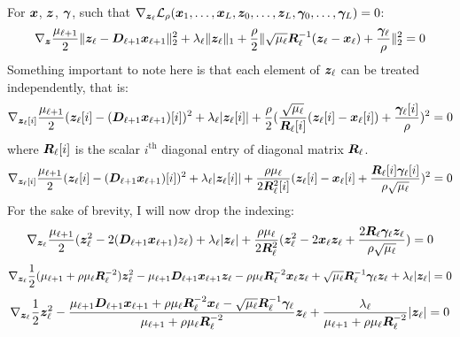 For $\bm{x}$, $\bm{z}$, $\bm{\gamma}$, such that $\nabla_{\bm{z}_{\ell}} \mathcal{L}_{\rho}(\bm{x}_1,\hdots,\bm{x}_L,\bm{z}_0,\hdots,\bm{z}_L,\bm{\gamma}_0,\hdots,\bm{\gamma}_L) = 0$:
%
\begin{equation}
\nabla_{\bm{z}} \frac{\mu_{\ell + 1}}{2}\|\bm{z}_{\ell} - \bm{D}_{\ell + 1}\bm{x}_{\ell + 1}\|_2^2 + \lambda_{\ell}\|\bm{z}_{\ell}\|_1 + \frac{\rho}{2} \|\sqrt{\mu_{\ell}}\bm{R}_{\ell}^{-1}(\bm{z}_{\ell} - \bm{x}_{\ell}) + \frac{\bm{\gamma}_{\ell}}{\rho}\|_2^2 = 0
\end{equation}
%
Something important to note here is that each element of $\bm{z}_{\ell}$ can be treated independently, that is:
%
\begin{equation}
\nabla_{\bm{z}_{\ell}[i]} \frac{\mu_{\ell + 1}}{2}(\bm{z}_{\ell}[i] - (\bm{D}_{\ell + 1}\bm{x}_{\ell + 1})[i])^2 + \lambda_{\ell}|\bm{z}_{\ell}[i]| + \frac{\rho}{2} (\frac{\sqrt{\mu_{\ell}}}{\bm{R}_{\ell}[i]}(\bm{z}_{\ell}[i] - \bm{x}_{\ell}[i]) + \frac{\bm{\gamma}_{\ell}[i]}{\rho})^2 = 0
\end{equation}
%
where $\bm{R}_{\ell}[i]$ is the scalar $i^{\text{th}}$ diagonal entry of diagonal matrix $\bm{R}_{\ell}$.
%
\begin{equation}
\nabla_{\bm{z}_{\ell}[i]} \frac{\mu_{\ell + 1}}{2}(\bm{z}_{\ell}[i] - (\bm{D}_{\ell + 1}\bm{x}_{\ell + 1})[i])^2 + \lambda_{\ell}|\bm{z}_{\ell}[i]| + \frac{\rho\mu_{\ell}}{2\bm{R}_{\ell}^2[i]} (\bm{z}_{\ell}[i] - \bm{x}_{\ell}[i] + \frac{\bm{R}_{\ell}[i]\bm{\gamma}_{\ell}[i]}{\rho\sqrt{\mu_{\ell}}})^2 = 0
\end{equation}
%
For the sake of brevity, I will now drop the indexing:
%
\begin{equation}
\nabla_{\bm{z}_{\ell}} \frac{\mu_{\ell + 1}}{2}(\bm{z}_{\ell}^2 - 2(\bm{D}_{\ell + 1}\bm{x}_{\ell + 1})z_{\ell}) + \lambda_{\ell}|\bm{z}_{\ell}| + \frac{\rho\mu_{\ell}}{2\bm{R}_{\ell}^2} (\bm{z}_{\ell}^2 - 2\bm{x}_{\ell}\bm{z}_{\ell} + \frac{2\bm{R}_{\ell}\bm{\gamma}_{\ell}\bm{z}_{\ell}}{\rho\sqrt{\mu_{\ell}}}) = 0
\end{equation}
%
\begin{equation}
\nabla_{\bm{z}_{\ell}} \frac{1}{2}(\mu_{\ell + 1} + \rho\mu_{\ell}\bm{R}_{\ell}^{-2})\bm{z}_{\ell}^2 - \mu_{\ell + 1}\bm{D}_{\ell + 1}\bm{x}_{\ell + 1}\bm{z}_{\ell} - \rho\mu_{\ell}\bm{R}_{\ell}^{-2}\bm{x}_{\ell}\bm{z}_{\ell} + \sqrt{\mu_{\ell}}\bm{R}_{\ell}^{-1}\bm{\gamma}_{\ell}\bm{z}_{\ell} + \lambda_{\ell}|\bm{z}_{\ell}| = 0
\end{equation}
%
\begin{equation}
\nabla_{\bm{z}_{\ell}} \frac{1}{2}\bm{z}_{\ell}^2 - \frac{\mu_{\ell + 1}\bm{D}_{\ell + 1}\bm{x}_{\ell + 1} + \rho\mu_{\ell}\bm{R}_{\ell}^{-2}\bm{x}_{\ell} - \sqrt{\mu_{\ell}}\bm{R}_{\ell}^{-1}\bm{\gamma}_{\ell}}{\mu_{\ell + 1} + \rho\mu_{\ell}\bm{R}_{\ell}^{-2}}\bm{z}_{\ell} + \frac{\lambda_{\ell}}{\mu_{\ell + 1} + \rho\mu_{\ell}\bm{R}_{\ell}^{-2}}|\bm{z}_{\ell}| = 0
\end{equation}
